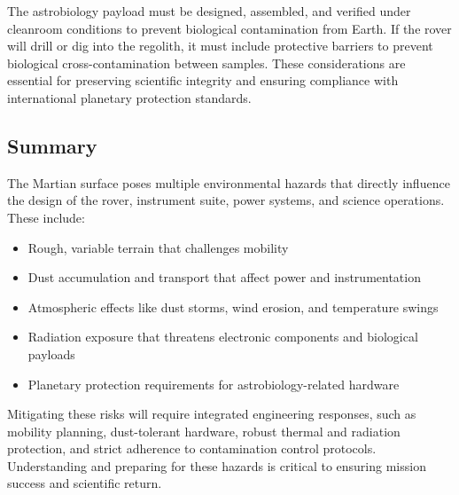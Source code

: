 The astrobiology payload must be designed, assembled, and verified under cleanroom conditions to prevent biological contamination from Earth. If the rover will drill or dig into the regolith, it must include protective barriers to prevent biological cross-contamination between samples. These considerations are essential for preserving scientific integrity and ensuring compliance with international planetary protection standards.

\subsection*{Summary}

The Martian surface poses multiple environmental hazards that directly influence the design of the rover, instrument suite, power systems, and science operations. These include:
\begin{itemize}
    \item Rough, variable terrain that challenges mobility
    \item Dust accumulation and transport that affect power and instrumentation
    \item Atmospheric effects like dust storms, wind erosion, and temperature swings
    \item Radiation exposure that threatens electronic components and biological payloads
    \item Planetary protection requirements for astrobiology-related hardware
\end{itemize}

Mitigating these risks will require integrated engineering responses, such as mobility planning, dust-tolerant hardware, robust thermal and radiation protection, and strict adherence to contamination control protocols. Understanding and preparing for these hazards is critical to ensuring mission success and scientific return.